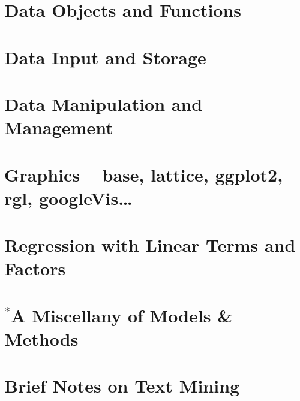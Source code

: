 \documentclass{tufte-book}\usepackage[]{graphicx}\usepackage[]{color}
\begin{document}
\chapter{Data Objects and Functions}


\cleartooddpage

\chapter{Data Input and Storage}\label{ch:input}

\cleartooddpage

\chapter{Data Manipulation and Management}\label{ch:manip}

\cleartooddpage

\chapter{Graphics -- base, lattice, ggplot2, rgl, googleVis\ldots}\label{ch:plots}


\cleartooddpage

\chapter{Regression with Linear Terms and Factors}

\cleartooddpage

\chapter[A Miscellany of Models \& Methods]{$^*$A Miscellany of Models \& Methods}

\cleartooddpage

% 

\chapter{Brief Notes on Text Mining}\label{ch:tm}

\cleartooddpage
\end{document}

